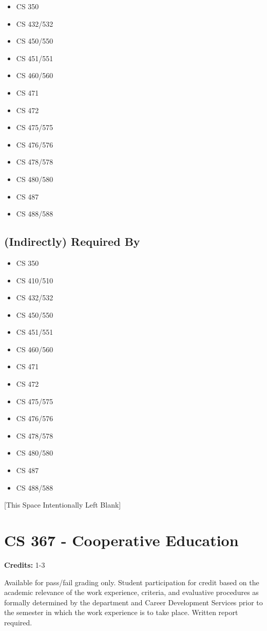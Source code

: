 \documentclass[]{article}
\providecommand{\tightlist}{%
  \setlength{\itemsep}{0pt}\setlength{\parskip}{0pt}}
\newcommand{\pagebreakhere}{
\vspace*{\fill}
\begin{center}
[This Space Intentionally Left Blank]
\end{center}
\vspace*{\fill}
\newpage
}
\begin{document}
\begin{itemize}
\tightlist
\item
  CS 350
\item
  CS 432/532
\item
  CS 450/550
\item
  CS 451/551
\item
  CS 460/560
\item
  CS 471
\item
  CS 472
\item
  CS 475/575
\item
  CS 476/576
\item
  CS 478/578
\item
  CS 480/580
\item
  CS 487
\item
  CS 488/588
\end{itemize}

\subsection{(Indirectly) Required By}\label{indirectly-required-by-10}

\begin{itemize}
\tightlist
\item
  CS 350
\item
  CS 410/510
\item
  CS 432/532
\item
  CS 450/550
\item
  CS 451/551
\item
  CS 460/560
\item
  CS 471
\item
  CS 472
\item
  CS 475/575
\item
  CS 476/576
\item
  CS 478/578
\item
  CS 480/580
\item
  CS 487
\item
  CS 488/588
\end{itemize}

\pagebreakhere
\section{CS 367 - Cooperative
Education}\label{cs-367---cooperative-education}

\textbf{Credits:} 1-3

Available for pass/fail grading only. Student participation for credit
based on the academic relevance of the work experience, criteria, and
evaluative procedures as formally determined by the department and
Career Development Services prior to the semester in which the work
experience is to take place. Written report required.
\end{document}

